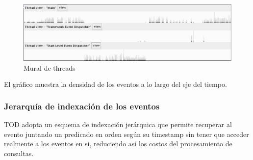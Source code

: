 \documentclass[12pt,legalpaper]{report}
\begin{document}
\begin{figure}[hpb]
	\centering
	\includegraphics[scale=0.4]{images/TOD/ThreadMural.eps}
	\caption{Mural de threads}
	\label{threadMurals}
\end{figure}

El gráfico muestra la densidad de los eventos a lo largo del eje del tiempo.

			\subsubsection{Jerarquía de indexación de los eventos}

TOD adopta un esquema de indexación jerárquica que permite recuperar al evento juntando un predicado en orden según su timestamp sin tener que acceder realmente a los eventos en si, reduciendo así los costos del procesamiento de consultas.
\end{document}

